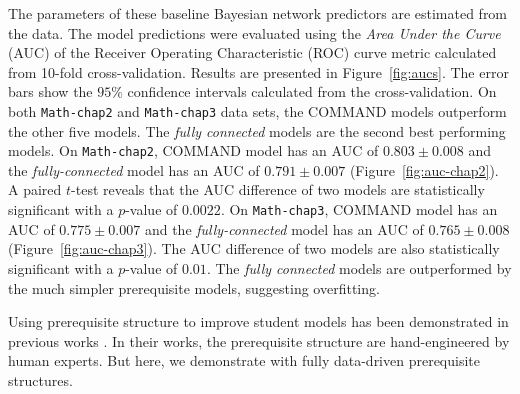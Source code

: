\documentclass{edm_template}
\newcommand{\hl}[1]{\colorbox{yellow}{#1}}
\begin{document}
	The parameters of these baseline Bayesian network predictors are estimated from the data.
	The model predictions were evaluated using the \textit{Area Under the Curve} (AUC) of the Receiver Operating Characteristic (ROC) curve metric 
	calculated from 10-fold cross-validation.
	Results are presented in Figure~\ref{fig:aucs}. 
	The error bars show the $95\%$ confidence intervals calculated from the cross-validation.
	On both \texttt{Math-chap2} and \texttt{Math-chap3} data sets, the COMMAND models outperform the other five models.
	The \emph{fully connected} models are the second best performing models.
	On \texttt{Math-chap2}, COMMAND model has an AUC of $0.803\pm0.008$ and the \emph{fully-connected} model has an AUC of $0.791\pm0.007$ (Figure~\ref{fig:auc-chap2}).
	A paired $t$-test reveals that the AUC difference of two models are statistically significant with a $p$-value of $0.0022$.
	On \texttt{Math-chap3}, COMMAND model has an AUC of $0.775\pm0.007$ and the \emph{fully-connected} model has an AUC of $0.765\pm0.008$ (Figure~\ref{fig:auc-chap3}).
	The AUC difference of two models are also statistically significant with a $p$-value of $0.01$.
	The \emph{fully connected} models are outperformed by the much simpler prerequisite models, suggesting overfitting.
	
	Using prerequisite structure to improve student models has been demonstrated in previous works \cite{kaser2014beyond, botelho2015prediction}.
	In their works, the prerequisite structure are hand-engineered by human experts. But here, we demonstrate with fully data-driven prerequisite structures.
	
	
	
\end{document}

